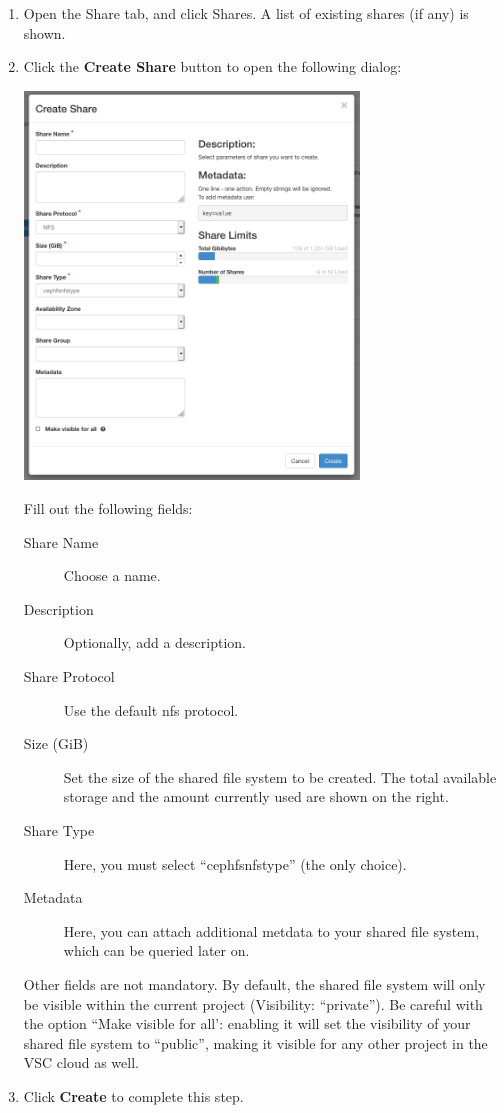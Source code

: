 \begin{enumerate}
\item Open the Share tab, and click Shares.  A list of existing shares (if any) is shown.
\item Click the \textbf{Create Share} button to open the following dialog:
  \begin{center}
    \includegraphics[width=0.7\textwidth]{img/create_share}
  \end{center}
  Fill out the following fields:
  \begin{description}
  \item[Share Name] Choose a name.
  \item[Description] Optionally, add a description.
  \item[Share Protocol] Use the default \gls{nfs} protocol.
  \item[Size (GiB)] Set the size of the shared file system to be
    created.  The total available storage and the amount currently
    used are shown on the right.
  \item[Share Type] Here, you must select ``cephfsnfstype'' (the only choice).
  \item[Metadata] Here, you can attach additional metdata to your
    shared file system, which can be queried later on.
  \end{description}
  Other fields are not mandatory.  By default, the shared file system
  will only be visible within the current project (Visibility:
  ``private'').  Be careful with the option ``Make visible for all':
  enabling it will set the visibility of your shared file system to
  ``public'', making it visible for any other project in the VSC cloud
  as well.
\item Click \textbf{Create} to complete this step.
\end{enumerate}

